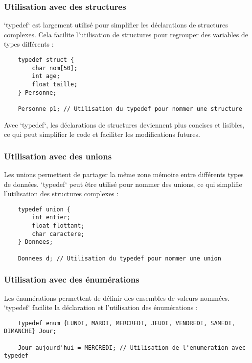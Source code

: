 \subsubsection*{Utilisation avec des structures}

`typedef` est largement utilisé pour simplifier les déclarations de structures complexes. Cela facilite l'utilisation de structures pour regrouper des variables de types différents :

\begin{lstlisting}
	typedef struct {
		char nom[50];
		int age;
		float taille;
	} Personne;
	
	Personne p1; // Utilisation du typedef pour nommer une structure
\end{lstlisting}

Avec `typedef`, les déclarations de structures deviennent plus concises et lisibles, ce qui peut simplifier le code et faciliter les modifications futures.

\subsubsection*{Utilisation avec des unions}

Les unions permettent de partager la même zone mémoire entre différents types de données. `typedef` peut être utilisé pour nommer des unions, ce qui simplifie l'utilisation des structures complexes :

\begin{lstlisting}
	typedef union {
		int entier;
		float flottant;
		char caractere;
	} Donnees;
	
	Donnees d; // Utilisation du typedef pour nommer une union
\end{lstlisting}

\subsubsection*{Utilisation avec des énumérations}

Les énumérations permettent de définir des ensembles de valeurs nommées. `typedef` facilite la déclaration et l'utilisation des énumérations :

\begin{lstlisting}
	typedef enum {LUNDI, MARDI, MERCREDI, JEUDI, VENDREDI, SAMEDI, DIMANCHE} Jour;
	
	Jour aujourd'hui = MERCREDI; // Utilisation de l'enumeration avec typedef
\end{lstlisting}


